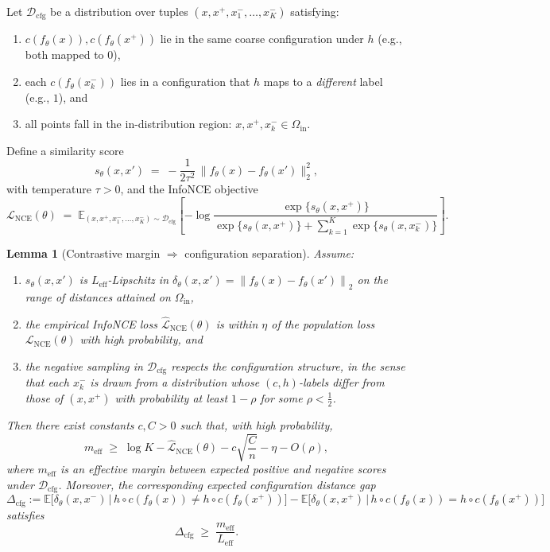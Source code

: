 \documentclass[11pt]{article}
\newcommand{\E}{\mathbb{E}}
\newcommand{\norm}[1]{\left\lVert #1 \right\rVert}
\newtheorem{lemma}{Lemma}
\begin{document}
Let $\mathcal{D}_{\mathrm{cfg}}$ be a distribution over tuples
$(x, x^+, x^-_1,\dots,x^-_K)$ satisfying:
\begin{enumerate}[label=(A\arabic*),leftmargin=*]
  \item $c(f_\theta(x)), c(f_\theta(x^+))$ lie in the same coarse configuration under $h$
    (e.g., both mapped to $0$),
  \item each $c(f_\theta(x^-_k))$ lies in a configuration that $h$ maps to a \emph{different} label
    (e.g., $1$), and
  \item all points fall in the in-distribution region: $x,x^+,x^-_k \in \Omega_{\mathrm{in}}$.
\end{enumerate}
Define a similarity score
\[
s_\theta(x,x') \;=\; -\frac{1}{2\tau^2}\,
\bigl\| f_\theta(x) - f_\theta(x') \bigr\|_2^2,
\]
with temperature $\tau>0$, and the InfoNCE objective
\begin{equation}
\label{eq:existence-nce}
\mathcal{L}_{\mathrm{NCE}}(\theta)
\;=\;
\E_{(x,x^+,x^-_1,\dots,x^-_K) \sim \mathcal{D}_{\mathrm{cfg}}}
\left[
  -\log \frac{\exp\{s_\theta(x,x^+)\}}{
  \exp\{s_\theta(x,x^+)\} + \sum_{k=1}^K \exp\{s_\theta(x,x^-_k)\}}
\right].
\end{equation}

\begin{lemma}[Contrastive margin $\Rightarrow$ configuration separation]
\label{lem:nce-separation}
Assume:
\begin{enumerate}[label=(B\arabic*),leftmargin=*]
  \item $s_\theta(x,x')$ is $L_{\mathrm{eff}}$-Lipschitz in
    $\delta_\theta(x,x') = \norm{f_\theta(x) - f_\theta(x')}_2$ on the range of distances attained
    on $\Omega_{\mathrm{in}}$,
  \item the empirical InfoNCE loss $\widehat{\mathcal{L}}_{\mathrm{NCE}}(\theta)$ is within $\eta$ of
    the population loss $\mathcal{L}_{\mathrm{NCE}}(\theta)$ with high probability, and
  \item the negative sampling in $\mathcal{D}_{\mathrm{cfg}}$ respects the configuration structure,
    in the sense that each $x^-_k$ is drawn from a distribution whose $(c,h)$-labels differ from
    those of $(x,x^+)$ with probability at least $1-\rho$ for some $\rho < \tfrac{1}{2}$.
\end{enumerate}
Then there exist constants $c,C>0$ such that, with high probability,
\[
m_{\mathrm{eff}}
\;\ge\;
\log K - \widehat{\mathcal{L}}_{\mathrm{NCE}}(\theta)
- c \sqrt{\frac{C}{n}} - \eta - O(\rho),
\]
where $m_{\mathrm{eff}}$ is an effective margin between expected positive and negative scores
under $\mathcal{D}_{\mathrm{cfg}}$. Moreover, the corresponding expected \emph{configuration distance}
gap
\[
\Delta_{\mathrm{cfg}}
:=
\E\bigl[ \delta_\theta(x,x^-) \,\big|\, h\!\circ c(f_\theta(x)) \neq h\!\circ c(f_\theta(x^+)) \bigr]
-
\E\bigl[ \delta_\theta(x,x^+) \,\big|\, h\!\circ c(f_\theta(x)) = h\!\circ c(f_\theta(x^+)) \bigr]
\]
satisfies
\[
\Delta_{\mathrm{cfg}} \;\ge\; \frac{m_{\mathrm{eff}}}{L_{\mathrm{eff}}}.
\]
\end{lemma}
\end{document}
